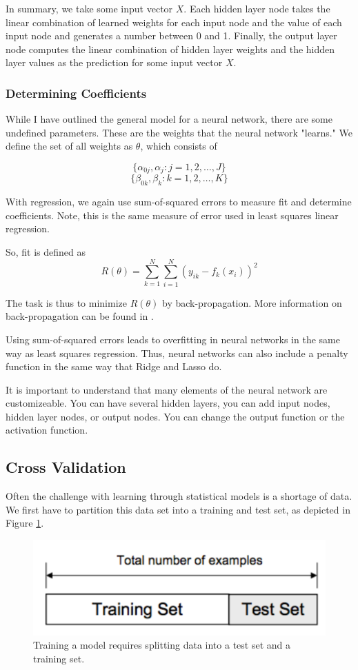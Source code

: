 \documentclass[12pt]{article}
\begin{document}
In summary, we take some input vector $X$. Each hidden layer node takes the linear combination of learned weights for each input node and the value of each input node and generates a number between 0 and 1. Finally, the output layer node computes the linear combination of hidden layer weights and the hidden layer values as the prediction for some input vector $X$.

\subsubsection{Determining Coefficients}
While I have outlined the general model for a neural network, there are some undefined parameters. These are the weights that the neural network "learns." We define the set of all weights as $\theta$, which consists of 

$$\{\alpha_{0j}, \alpha_j: j = 1, 2, \dots, J\}$$
$$\{\beta_{0k}, \beta_k:  k= 1, 2, \dots, K\}$$

With regression, we again use sum-of-squared errors to measure fit and determine coefficients. Note, this is the same measure of error used in least squares linear regression.

So, fit is defined as 
$$R(\theta) = \sum_{k=1}^{N} \sum_{i=1}^{N} (y_{ik} - f_k(x_i))^2$$ 

The task is thus to minimize $R(\theta)$ by back-propagation. More information on back-propagation can be found in \cite[354]{springer}. 

Using sum-of-squared errors leads to overfitting in neural networks in the same way as least squares regression. Thus, neural networks can also include a penalty function in the same way that Ridge and Lasso do. 

It is important to understand that many elements of the neural network are customizeable. You can have several hidden layers, you can add input nodes, hidden layer nodes, or output nodes. You can change the output function or the activation function. 
\subsection{Cross Validation}
Often the challenge with learning through statistical models is a shortage of data. We first have to partition this data set into a training and test set, as depicted in Figure \ref{test_train}.

\begin{figure}[ht]
	\centering
	\includegraphics[width=.5\textwidth]{test_train.png}
	\caption{Training a model requires splitting data into a test set and a training set. \cite{kfold}}
	\label{test_train}
\end{figure}
\end{document}
